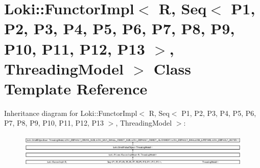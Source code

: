 \hypertarget{classLoki_1_1FunctorImpl_3_01R_00_01_01_01_01_01_01_01_01_01_01_01_01_01_01_01_01_01_01_01_01_014965e6be24aaa77e42ff93e5d285477f}{}\section{Loki\+:\+:Functor\+Impl$<$ R, Seq$<$ P1, P2, P3, P4, P5, P6, P7, P8, P9, P10, P11, P12, P13 $>$, Threading\+Model $>$ Class Template Reference}
\label{classLoki_1_1FunctorImpl_3_01R_00_01_01_01_01_01_01_01_01_01_01_01_01_01_01_01_01_01_01_01_01_014965e6be24aaa77e42ff93e5d285477f}
Inheritance diagram for Loki\+:\+:Functor\+Impl$<$ R, Seq$<$ P1, P2, P3, P4, P5, P6, P7, P8, P9, P10, P11, P12, P13 $>$, Threading\+Model $>$\+:\begin{figure}[H]
\begin{center}
\leavevmode
\includegraphics[height=1.631464cm]{classLoki_1_1FunctorImpl_3_01R_00_01_01_01_01_01_01_01_01_01_01_01_01_01_01_01_01_01_01_01_01_014965e6be24aaa77e42ff93e5d285477f}
\end{center}
\end{figure}
